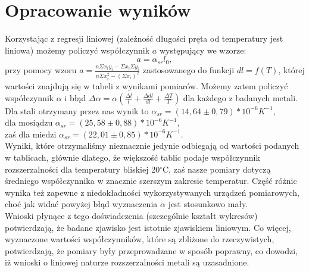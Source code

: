 \documentclass[10pt,a4paper]{article}
\newcommand{\forceindent}{\leavevmode{\parindent=3em\indent}}
\begin{document}
\section{Opracowanie wyników}
\forceindent Korzystając z regresji liniowej (zależność długości pręta od temperatury jest liniowa) możemy policzyć współczynnik $a$ występujący we wzorze:
\begin{equation}
a = \alpha_{sr} l_{0},
\end{equation}
przy pomocy wzoru $a=\frac{n\Sigma x_i y_i - \Sigma x_i \Sigma y_i}{n\Sigma x_i^2 - (\Sigma x_i)^2}$ zastosowanego do funkcji $dl = f(T)$, której wartości znajdują się w tabeli z wynikami pomiarów.
Możemy zatem policzyć współczynnik $\alpha$  i błąd $\Delta\alpha = \alpha(\frac{\Delta l}{l} + \frac{\Delta dl}{dl} + \frac{\Delta T}{T})$ dla każdego z badanych metali.\\
Dla stali otrzymany przez nas wynik to $\alpha_{sr}=(14,64 \pm 0,79)*10^{-6} K^{-1}$,\\
dla mosiądzu $\alpha_{sr}=(25,58 \pm 0,88)*10^{-6} K^{-1}$,\\
zaś dla miedzi $\alpha_{sr}=(22,01 \pm 0,85)*10^{-6} K^{-1}$.\\
\newline \forceindent Wyniki, które otrzymaliśmy nieznacznie jedynie odbiegają od wartości podanych w tablicach, głównie dlatego, że większość tablic podaje współczynnik 
rozszerzalności dla temperatury bliskiej 20$^{\circ}$C, zaś nasze pomiary dotyczą średniego współczynnika w znacznie szerszym zakresie temperatur.
Część różnic wynika też zapewne z niedokładności wykorzystywanych urządzeń pomiarowych, choć jak widać powyżej błąd wyznaczenia $\alpha$ jest stosunkowo mały.\\
Wnioski płynące z tego doświadczenia (szczególnie kształt wykresów) potwierdzają, że badane zjawisko jest istotnie zjawiskiem liniowym. Co więcej, wyznaczone wartości współczynników, które są zbliżone do rzeczywistych, potwierdzają, że pomiary były przeprowadzane w sposób poprawny, co dowodzi, iż wnioski o liniowej naturze rozszerzalności metali są uzasadnione.
\end{document}
